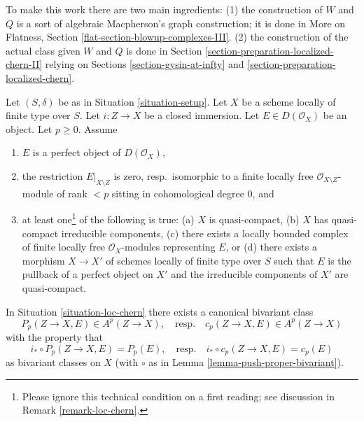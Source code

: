 \medskip\noindent
To make this work there are two main ingredients: (1) the construction of
$W$ and $Q$ is a sort of algebraic Macpherson's graph construction; it
is done in More on Flatness, Section \ref{flat-section-blowup-complexes-III}.
(2) the construction of the actual class given $W$ and $Q$ is done in
Section \ref{section-preparation-localized-chern-II} relying on
Sections \ref{section-gysin-at-infty} and
\ref{section-preparation-localized-chern}.

\begin{situation}
\label{situation-loc-chern}
Let $(S, \delta)$ be as in Situation \ref{situation-setup}. Let $X$ be a scheme
locally of finite type over $S$. Let $i : Z \to X$ be a closed immersion.
Let $E \in D(\mathcal{O}_X)$ be an object. Let $p \geq 0$. Assume
\begin{enumerate}
\item $E$ is a perfect object of $D(\mathcal{O}_X)$,
\item the restriction $E|_{X \setminus Z}$ is zero, resp.\ isomorphic to a
finite locally free $\mathcal{O}_{X \setminus Z}$-module of rank $< p$
sitting in cohomological degree $0$, and
\item at least one\footnote{Please ignore this technical condition on a
first reading; see discussion in Remark \ref{remark-loc-chern}.}
of the following is true:
(a) $X$ is quasi-compact,
(b) $X$ has quasi-compact irreducible components,
(c) there exists a locally bounded complex of finite locally free
$\mathcal{O}_X$-modules representing $E$, or
(d) there exists a morphism $X \to X'$ of schemes locally of finite type
over $S$ such that $E$ is the pullback of a perfect object on $X'$ and
the irreducible components of $X'$ are quasi-compact.
\end{enumerate}
\end{situation}

\begin{lemma}
\label{lemma-independent-loc-chern}
In Situation \ref{situation-loc-chern} there exists a canonical bivariant class
$$
P_p(Z \to X, E) \in A^p(Z \to X),
\quad\text{resp.}\quad
c_p(Z \to X, E) \in A^p(Z \to X)
$$
with the property that
\begin{equation}
\label{equation-defining-property-localized-classes}
i_* \circ P_p(Z \to X, E) = P_p(E),
\quad\text{resp.}\quad
i_* \circ c_p(Z \to X, E) = c_p(E)
\end{equation}
as bivariant classes on $X$ (with $\circ$ as in
Lemma \ref{lemma-push-proper-bivariant}).
\end{lemma}

